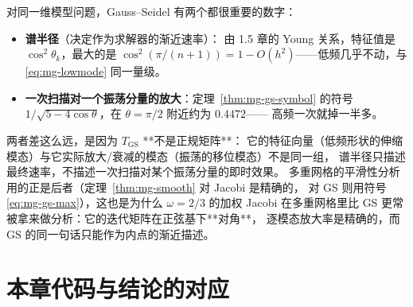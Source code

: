 \begin{remark}
对同一维模型问题，Gauss--Seidel 有两个都很重要的数字：
\begin{itemize}
  \item \textbf{谱半径}（决定作为求解器的渐近速率）：
        由 1.5 章的 Young 关系，特征值是 $\cos^2\theta_k$，最大的是
        $\cos^2(\pi/(n+1))=1-O(h^2)$——低频几乎不动，与 \eqref{eq:mg-lowmode} 同一量级。
  \item \textbf{一次扫描对一个振荡分量的放大}：定理~\ref{thm:mg-gs-symbol} 的符号
        $1/\sqrt{5-4\cos\theta}$，在 $\theta=\pi/2$ 附近约为 $0.4472$——
        高频一次就掉一半多。
\end{itemize}
两者差这么远，是因为 $T_{\mathrm{GS}}$ **不是正规矩阵**：
它的特征向量（低频形状的伸缩模态）与它实际放大/衰减的模态（振荡的移位模态）不是同一组，
谱半径只描述最终速率，不描述一次扫描对某个振荡分量的即时效果。
多重网格的平滑性分析用的正是后者（定理~\ref{thm:mg-smooth} 对 Jacobi 是精确的，
对 GS 则用符号 \eqref{eq:mg-gs-max}），这也是为什么 $\omega=2/3$ 的加权 Jacobi
在多重网格里比 GS 更常被拿来做分析：它的迭代矩阵在正弦基下**对角**，
逐模态放大率是精确的，而 GS 的同一句话只能作为内点的渐近描述。
\end{remark}

\section{本章代码与结论的对应}
\label{sec:mg-code}


